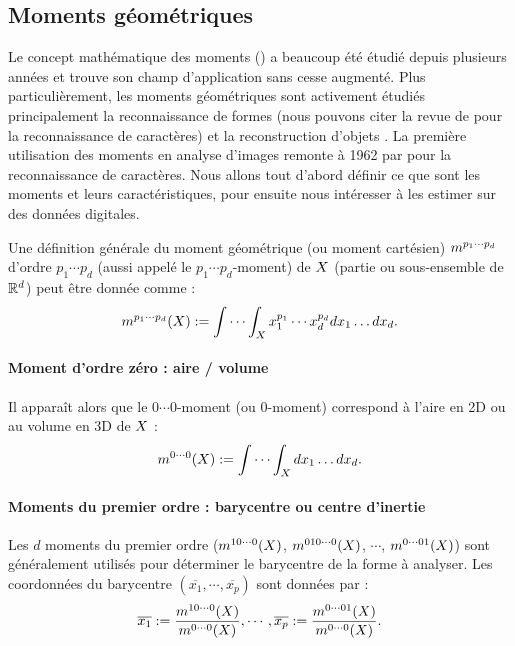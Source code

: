\subsection{Moments géométriques}
\label{sec:moments-geo}
%
Le concept mathématique des moments () a beaucoup
été étudié depuis plusieurs années et trouve son champ d'application sans cesse
augmenté. Plus particulièrement, les moments géométriques sont activement
étudiés principalement la reconnaissance de formes (nous pouvons citer la revue
de  pour la reconnaissance de caractères) et la
reconstruction d'objets \cite{Ghorbel2005}. La première utilisation des moments
en analyse d'images remonte à 1962 par  pour la
reconnaissance de caractères.
%
Nous allons tout d'abord définir ce que sont les moments et leurs
caractéristiques, pour ensuite nous intéresser à les estimer sur des données
digitales.

%
%
%
Une définition générale du moment géométrique (ou moment cartésien) $m^{p_1
\cdots p_d}$ d'ordre $p_1 \cdots p_d$ (aussi appelé le $p_1 \cdots p_d$-moment)
de $X$ (partie ou sous-ensemble de $\mathbb{R}^d$) peut être donnée comme :
%
\begin{equation}
  m^{p_1 \cdots p_d}(X) := \idotsint_{X} x_1^{p_1} \cdots x_d^{p_d} dx_1 \ldots dx_d.
\end{equation}
%
\paragraph{Moment d'ordre zéro : aire / volume}
%
Il apparaît alors que le $0\cdots0$-moment (ou $0$-moment) correspond à l'aire
en 2D ou au volume en 3D de $X$ :
%
\begin{equation}
  m^{0 \cdots 0}(X) := \idotsint_{X}  dx_1 \ldots dx_d.
\end{equation}
%
\paragraph{Moments du premier ordre : barycentre ou centre d'inertie}
%
Les $d$ moments du premier ordre ($m^{1 0 \cdots 0}(X)$, $m^{0 1 0
\cdots 0}(X)$, $\cdots$, $m^{0 \cdots 0 1}(X)$) sont généralement
utilisés pour déterminer le barycentre de la forme à analyser. Les coordonnées
du barycentre $(\overline{x_1}, \cdots, \overline{x_p})$ sont données par :
%
\begin{equation}
  \overline{x_1} := \frac{m^{1 0 \cdots 0}(X)}{m^{0 \cdots 0}(X)}, \cdots, \overline{x_p} := \frac{m^{0 \cdots 0 1}(X)}{m^{0 \cdots 0}(X)}.
\end{equation}
%
